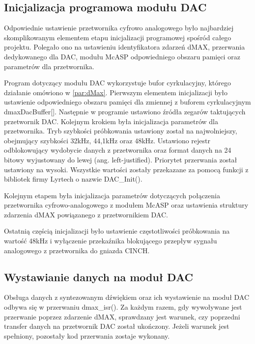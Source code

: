 \subsection{Inicjalizacja programowa modułu DAC}
Odpowiednie ustawienie przetwornika cyfrowo analogowego było najbardziej skomplikowanym elementem etapu inicjalizacji programowej spośród całego projektu. Polegało ono na ustawieniu identyfikatora zdarzeń dMAX, przerwania dedykowanego dla DAC, modułu McASP odpowiedniego obszaru pamięci oraz parametrów dla przetwornika. 

Program dotyczący modułu DAC wykorzystuje bufor cyrkulacyjny, którego działanie omówiono w \ref{par:dMax}. Pierwszym elementem inicjalizacji było ustawienie odpowiedniego obszaru pamięci dla zmiennej z buforem cyrkulacyjnym dmaxDacBuffer[]. Następnie w programie ustawiono źródła zegarów taktujących przetwornik DAC. Kolejnym krokiem była inicjalizacja parametrów dla przetwornika. Tryb szybkości próbkowania ustawiony został na najwolniejszy, obejmujący szybkości 32kHz, 44,1kHz oraz 48kHz. Ustawiono rejestr odblokowujący wydobycie danych z przetwornika oraz format danych na 24 bitowy wyjustowany do lewej (ang. left-justified). Priorytet przerwania został ustawiony na wysoki. Wszystkie wartości zostały przekazane za pomocą funkcji z bibliotek firmy Lyrtech o nazwie DAC\_Init().

Kolejnym etapem była inicjalizacja parametrów dotyczących połączenia przetwornika cyfrowo-analogowego z modułem McASP oraz ustawienia struktury zdarzenia dMAX powiązanego z przetwornikiem DAC. 

Ostatnią częścią inicjalizacji było ustawienie częstotliwości próbkowania na wartość 48kHz i wyłączenie przekaźnika blokującego przepływ sygnału analogowego z przetwornika do gniazda CINCH.

\subsection{Wystawianie danych na moduł DAC}
Obsługa danych z syntezowanym dźwiękiem oraz ich wystawienie na moduł DAC odbywa się w przerwaniu dmax\_isr(). Za każdym razem, gdy wywoływane jest przerwanie poprzez zdarzenie dMAX, sprawdzany jest warunek, czy poprzedni transfer danych na przetwornik DAC został ukończony. Jeżeli warunek jest spełniony, pozostały kod przerwania zostaje wykonany.

